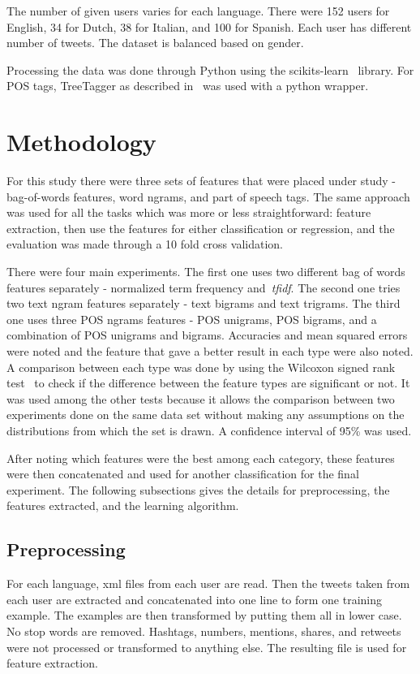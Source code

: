 \documentclass[a4paper]{llncs}
\begin{document}
The number of given users varies for each language. There were 152 users for English, 34 for Dutch, 38 for Italian, and 100 for Spanish. Each user has different number of tweets. The dataset is balanced based on gender. 

Processing the data was done through Python using the scikits-learn~\cite{scikit-learn} library. For POS tags, TreeTagger as described in~\cite{schmid1994probabilistic} was used with a python wrapper. 

\section{Methodology}
For this study there were three sets of features that were placed under study - bag-of-words features, word ngrams, and  part of speech tags. The same approach was used for all the tasks which was more or less straightforward: feature extraction, then use the features for either classification or regression, and the evaluation was made through a 10 fold cross validation.

There were four main experiments. The first one uses two different bag of words features separately - normalized term frequency and~\textit{tfidf}. The second one tries two text ngram features separately - text bigrams and text trigrams. The third one uses three POS ngrams features - POS unigrams, POS bigrams, and a combination of POS unigrams and bigrams. Accuracies and mean squared errors were noted and the feature that gave a better result in each type were also noted. A comparison between each type was done by using the Wilcoxon signed rank test~\cite{wilcoxon1945individual} to check if the difference between the feature types are significant or not. It was used among the other tests because it allows the comparison between two experiments done on the same data set without making any assumptions on the distributions from which the set is drawn. A confidence interval of 95\% was used.

After noting which features were the best among each category, these features were then concatenated and used for another classification for the final experiment. The following subsections gives the details for preprocessing, the features extracted, and the learning algorithm.
\subsection{Preprocessing}
For each language, xml files from each user are read. Then the tweets taken from each user are extracted and concatenated into one line to form one training example. The examples are then transformed by putting them all in lower case. No stop words are removed. Hashtags, numbers, mentions, shares, and retweets were not processed or transformed to anything else. The resulting file is used for feature extraction.  
\end{document}

